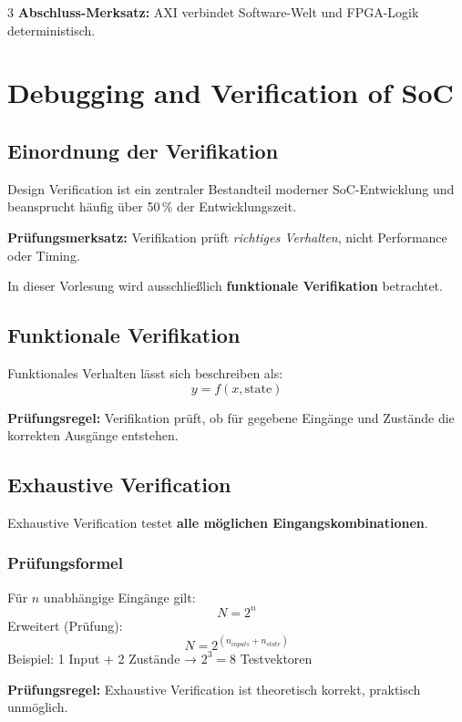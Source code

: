 \documentclass[10pt,a4paper]{article}
\newcommand{\hilite}[1]{\colorbox{yellow!25}{#1}}
\newcommand{\imp}[1]{\textbf{\textcolor{codeemph}{#1}}}
\begin{document}
\begin{multicols}{3}
\imp{Abschluss-Merksatz:}  
\hilite{AXI} \hilite{verbindet} \hilite{Software-Welt} und FPGA-Logik deterministisch.



\section{Debugging and Verification of SoC}

\subsection{Einordnung der Verifikation}
Design Verification ist ein zentraler Bestandteil moderner SoC-Entwicklung und beansprucht häufig über 50\,\% der Entwicklungszeit.

\imp{Prüfungsmerksatz:}  
\hilite{Verifikation} \hilite{prüft} \emph{richtiges Verhalten}, nicht Performance oder \hilite{Timing}.

In dieser Vorlesung wird ausschließlich \textbf{funktionale Verifikation} betrachtet.

\subsection{Funktionale Verifikation}
Funktionales Verhalten lässt sich beschreiben als:
\[
y = f(x, \text{state})
\]

\imp{Prüfungsregel:}  
\hilite{Verifikation} \hilite{prüft}, ob für \hilite{gegebene} Eingänge und Zustände die korrekten Ausgänge entstehen.

\subsection{Exhaustive Verification}
Exhaustive Verification testet \textbf{alle möglichen Eingangskombinationen}.

\subsubsection*{\textcolor{codeemph}{Prüfungsformel}}
Für $n$ unabhängige Eingänge gilt:
\[
N = 2^n
\]
Erweitert (Prüfung): \\
\[
N = 2^{(n_{inputs} + n_{state})}
\]
Beispiel: 1 Input + 2 Zustände → $2^3 = 8$ Testvektoren


\imp{Prüfungsregel:}  
\hilite{Exhaustive} \hilite{Verification} ist \hilite{theoretisch} korrekt, praktisch unmöglich.


\end{multicols}
\end{document}
